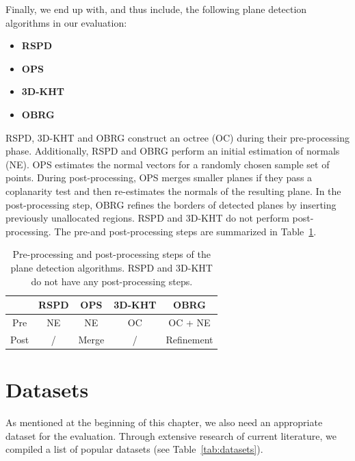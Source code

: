 \documentclass[main.tex]{subfiles}
\begin{document}
Finally, we end up with, and thus include, the following plane detection algorithms in our evaluation:

\begin{itemize}
    \item \textbf{RSPD}
    \item \textbf{OPS}
    \item \textbf{3D-KHT}
    \item \textbf{OBRG}
\end{itemize}


RSPD, 3D-KHT and OBRG construct an octree (OC) during their pre-processing phase. Additionally, RSPD and OBRG perform an initial
estimation of normals (NE). OPS estimates the normal vectors for a randomly chosen sample set of points.
During post-processing, OPS merges smaller planes if they pass a coplanarity test and then re-estimates the normals of the
resulting plane. In the post-processing step, OBRG refines the borders of detected planes by inserting
previously unallocated regions. RSPD and 3D-KHT do not perform post-processing.
The pre-and post-processing steps are summarized in Table~\ref{tab:pre-post}.


\begin{table}[H]
    \centering
    \begin{tabular}{c|cccc}
             & RSPD & OPS   & 3D-KHT & OBRG       \\ \hline
        Pre  & NE   & NE    & OC     & OC + NE    \\
        Post & /    & Merge & /      & Refinement
    \end{tabular}
    \caption{Pre-processing and post-processing steps of the plane detection algorithms. RSPD and 3D-KHT do not have any post-processing steps.}
    \label{tab:pre-post}
\end{table}




\section{Datasets}
\label{sec:datasets}
As mentioned at the beginning of this chapter, we also need an appropriate dataset for the evaluation.
Through extensive research of current literature, we compiled a list of popular datasets (see Table~\ref{tab:datasets}).
\end{document}
